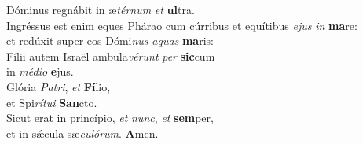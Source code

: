 \evenverse Dóminus regnábit in æ\textit{tér}\textit{num} \textit{et} \textbf{ul}tra.\\
\oddverse Ingréssus est enim eques Phárao cum cúrribus et equítibus \textit{e}\textit{jus} \textit{in} \textbf{ma}re:~\*\\
\oddverse et redúxit super eos Dómi\textit{nus} \textit{a}\textit{quas} \textbf{ma}ris:\\
\evenverse Fílii autem Israël ambula\textit{vé}\textit{runt} \textit{per} \textbf{sic}cum~\*\\
\evenverse in \textit{mé}\textit{di}\textit{o} \textbf{e}jus.\\
\oddverse Glória \textit{Pa}\textit{tri}, \textit{et} \textbf{Fí}lio,~\*\\
\oddverse et Spi\textit{rí}\textit{tu}\textit{i} \textbf{San}cto.\\
\evenverse Sicut erat in princípio, \textit{et} \textit{nunc}, \textit{et} \textbf{sem}per,~\*\\
\evenverse et in sǽcula sæ\textit{cu}\textit{ló}\textit{rum}. \textbf{A}men.\\
